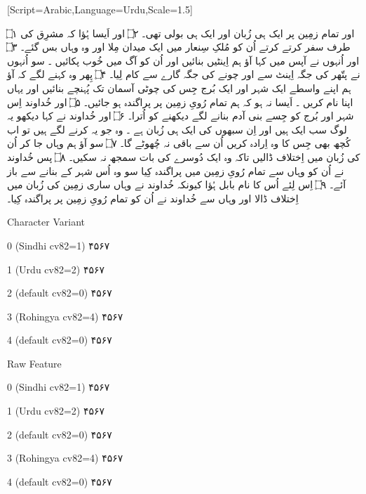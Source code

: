 \documentclass[12pt,fleqn,titlepage,twoside,a4paper]{book}
\begin{document}
\begin{arab}[utf]

[Script=Arabic,Language=Urdu,Scale=1.5]


۝۱ اور تمام زمِین پر ایک ہی زُبان اور ایک ہی بولی تھی۔ ۝۲  اور اَیسا ہُؤا کہ مشرِق کی طرف سفر کرتے کرتے اُن کو مُلکِ سِنعار میں ایک میدان مِلا اور وہ وہاں بس گئے۔ ۝۳ اور اُنہوں نے آپس میں کہا آؤ ہم اِینٹیں بنائیں اور اُن کو آگ میں خُوب پکائیں ۔ سو اُنہوں نے پتّھر کی جگہ اِینٹ سے اور چونے کی جگہ گارے سے کام لِیا۔ ۝۴ پِھر وہ کہنے لگے کہ آؤ ہم اپنے واسطے ایک شہر اور ایک بُرج جِس کی چوٹی آسمان تک پُہنچے بنائیں اور یہاں اپنا نام کریں ۔ اَیسا نہ ہو کہ ہم تمام رُویِ زمِین پر پراگندہ ہو جائیں۔ ۝۵ اور خُداوند اِس شہر اور بُرج کو جِسے بنی آدم بنانے لگے دیکھنے کو اُترا۔ ۝۶ اور خُداوند نے کہا دیکھو یہ لوگ سب ایک ہیں اور اِن سبھوں کی ایک ہی زُبان ہے ۔ وہ جو یہ کرنے لگے ہیں تو اب کُچھ بھی جِس کا وہ اِرادہ کریں اُن سے باقی نہ چُھوٹے گا۔ ۝۷ سو آؤ ہم وہاں جا کر اُن کی زُبان میں اِختلاف ڈالیں تاکہ وہ ایک دُوسرے کی بات سمجھ نہ سکیں۔ ۝۸ پس خُداوند نے اُن کو وہاں سے تمام رُویِ زمِین میں پراگندہ کِیا سو وہ اُس شہر کے بنانے سے باز آئے۔ ۝۹ اِس لِئے اُس کا نام بابل ہُؤا کیونکہ خُداوند نے وہاں ساری زمِین کی زُبان میں اِختلاف ڈالا اور وہاں سے خُداوند نے اُن کو تمام رُویِ زمِین پر پراگندہ کِیا۔


Character Variant

 0 (Sindhi cv82=1)
۴۵۶۷

 1 (Urdu cv82=2)
۴۵۶۷

 2 (default cv82=0)
۴۵۶۷

 3 (Rohingya cv82=4)
۴۵۶۷

 4 (default cv82=0)
۴۵۶۷

Raw Feature

 0 (Sindhi cv82=1)
۴۵۶۷

 1 (Urdu cv82=2)
۴۵۶۷

 2 (default cv82=0)
۴۵۶۷

 3 (Rohingya cv82=4)
۴۵۶۷

 4 (default cv82=0)
۴۵۶۷

\end{arab}
\end{document}
